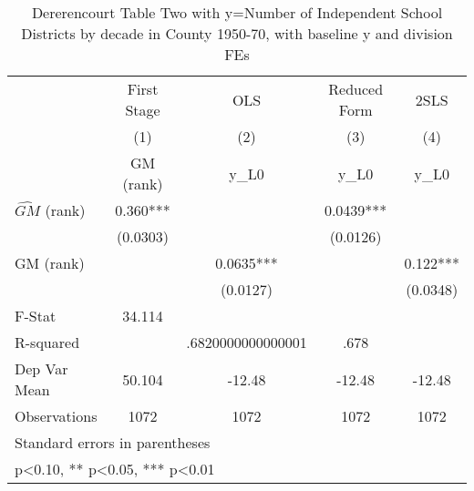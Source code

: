 \begin{table}[htbp]\centering
\def\sym#1{\ifmmode^{#1}\else\(^{#1}\)\fi}
\caption{Dererencourt Table Two with y=Number of Independent School Districts by decade in County 1950-70, with baseline y and division FEs}
\begin{tabular}{l*{4}{c}}
\toprule
                    & First Stage   &         OLS   &Reduced Form   &        2SLS   \\
                    &\multicolumn{1}{c}{(1)}&\multicolumn{1}{c}{(2)}&\multicolumn{1}{c}{(3)}&\multicolumn{1}{c}{(4)}\\
                    &\multicolumn{1}{c}{GM  (rank)}&\multicolumn{1}{c}{y\_L0}&\multicolumn{1}{c}{y\_L0}&\multicolumn{1}{c}{y\_L0}\\
\midrule
$\hat{GM}$ (rank)   &       0.360***&               &      0.0439***&               \\
                    &    (0.0303)   &               &    (0.0126)   &               \\
\addlinespace
GM  (rank)          &               &      0.0635***&               &       0.122***\\
                    &               &    (0.0127)   &               &    (0.0348)   \\
\midrule
F-Stat              &      34.114   &               &               &               \\
R-squared           &               &.6820000000000001   &        .678   &               \\
Dep Var Mean        &      50.104   &      -12.48   &      -12.48   &      -12.48   \\
Observations        &        1072   &        1072   &        1072   &        1072   \\
\bottomrule
\multicolumn{5}{l}{\footnotesize Standard errors in parentheses}\\
\multicolumn{5}{l}{\footnotesize * p<0.10, ** p<0.05, *** p<0.01}\\
\end{tabular}
\end{table}
